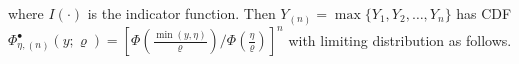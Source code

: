 where $I(\cdot)$ is the indicator function. Then
$Y_{(n)}=\max{\{Y_1,Y_2,\ldots,Y_n\}}$ has CDF 
$\Phi_{\eta,(n)}^\bullet(y;\varrho)\!= \!
\left[{\Phi(\frac{\min(y,\eta)}\varrho)}/{\Phi(\frac\eta\varrho)}\right]^n $ with limiting
distribution as follows.%
\begin{comment}
  A sufficient condition to determine if $G^\bullet(\cdot) \in
D(H)$, where $H(\cdot)$ is a CDF is to show that,
\begin{equation}
\lim_{x\rightarrow x_0} \frac{d}{dx}\left( \frac{1-F(x)}{f(x)}\right) = 0
\end{equation}
Recall that $x_0 = x_0(F) = \sup\{x|F(x) < 1\}$, for our case $x_0(F) =\sup\{x|F(x) < 1\} = \sup\{x| \Phi(x) < \Phi(\eta)\}$, clearly $x_0 = \eta$. If, 
\begin{equation}
\lim_{x\rightarrow \eta} \frac{d}{dx}\left( \frac{1-F(x)}{f(x)}\right) = 0
\end{equation}
then the truncated normal distribution belong to the Gumbel domain.
\begin{equation}
\begin{split}
\frac{d}{dx}\left( \frac{1-F(x)}{f(x)}\right) = \frac{d}{dx}\left((1-F(x))[f(x)]^{-1}\right)\\ 
 = -\frac{f'(x)(1-F(x))}{[f(x)]^2} - 1
\end{split}
\end{equation}
Using the above derivation, on the limit
\begin{equation}
\begin{split}
    \lim_{x\rightarrow \eta} \left(-\frac{f'(x)(1-F(x))}{[f(x)]^2} - 1\right)\\ 
    = \lim_{x\rightarrow \eta} \left( -\frac{f'(x)}{f(x)}\frac{(1-F(x))}{f(x)} - 1 \right)
\end{split}
\end{equation}
Using the corresponding density and distribution function in our case,$f(x) = \phi(x)/\Phi(\eta) I(x < \eta)$, $f'(x) =  \phi'(x)/\Phi(\eta) I(x < \eta)$and $F(x) = \Phi(x)/\Phi(\eta)I(x  < \eta)$
\begin{equation}
  \lim_{x\rightarrow \eta} \left( -\frac{\phi'(x)/\Phi(\eta)}{\phi(x)/\Phi(\eta)}\frac{(1-\Phi(x)/\Phi(\eta))}{\phi(x)/\Phi(\eta)} - 1 \right);
\end{equation}
The first expression $\frac{\phi'(x)}{\phi(x)} = x$,%
\begin{equation}

\end{comment}
